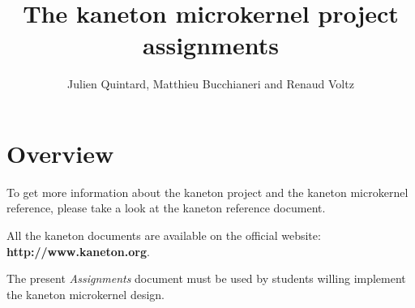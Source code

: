 
%
%



%
%


%
%

\title{The kaneton microkernel project assignments
       \logos}

%
%

\author{\small{Julien Quintard},
        \small{Matthieu Bucchianeri} and
        \small{Renaud Voltz}}

%
%



%
%

\maketitle

\newpage

\tableofcontents

\newpage

%
%

%
%

\section{Overview}

To get more information about the kaneton project and the kaneton
microkernel reference, please take a look at the kaneton reference
document.

All the kaneton documents are available on the official website:
\textbf{http://www.kaneton.org}.

The present \textit{Assignments} document must be used by students
willing implement the kaneton microkernel design.





%


